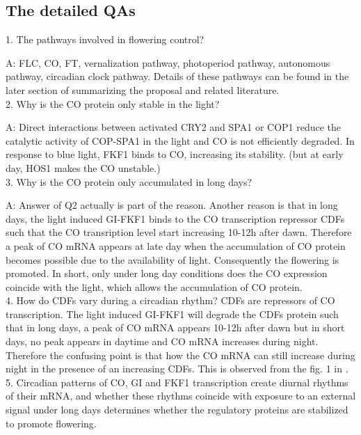 \documentclass[paper=a4, fontsize=12pt]{scrartcl}	%
\numberwithin{equation}{section}					%
\numberwithin{figure}{section}					%
\numberwithin{table}{section}					%
\begin{document}
\subsection{The detailed QAs}

1. The pathways involved in flowering control?

A: FLC, CO, FT, vernalization pathway, photoperiod pathway, autonomous pathway, circadian clock pathway. Details of these pathways can be found in the later section of summarizing the proposal and related literature. \\

2. Why is the CO protein only stable in the light?

A: Direct interactions between activated CRY2 and SPA1 or COP1 reduce the catalytic activity of COP-SPA1 in the light and CO is not efficiently degraded. In response to blue light, FKF1 binds to CO, increasing its stability. (but at early day, HOS1 makes the CO unstable.)\\

3. Why is the CO protein only accumulated in long days?

A: Answer of Q2 actually is part of the reason. Another reason is that in long days, the light induced  GI-FKF1 binds to the CO transcription repressor CDFs such that the CO transription level start increasing 10-12h after dawn. Therefore a peak of CO mRNA appears at late day when the accumulation of CO protein becomes possible due to the availability of light. Consequently the flowering is promoted. In short, only under long day conditions does the CO expression coincide with the light, which allows the accumulation of CO protein. \\

4. How do CDFs vary during a circadian rhythm? CDFs are repressors of CO transcription. The light induced GI-FKF1 will degrade the CDFs protein such that in long days, a peak of CO mRNA appears 10-12h after dawn but in short days, no peak appears in daytime and CO mRNA increases during night. Therefore the confusing point is that how the CO mRNA can still increase during night in the presence of an increasing CDFs. This is observed from the fig. 1 in \cite{turck2008}. \\

5. Circadian patterns of CO, GI and FKF1 transcription create diurnal rhythms of their mRNA, and whether these rhythms coincide with exposure to an external signal under long days determines whether the regulatory proteins are stabilized to promote flowering. \\
\end{document}

